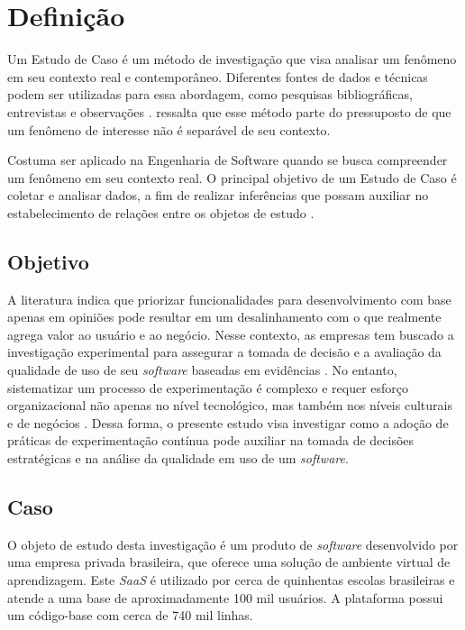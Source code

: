 \section{Definição}

Um Estudo de Caso é um método de investigação que visa analisar um fenômeno em seu contexto real e contemporâneo. Diferentes fontes de dados e técnicas podem ser utilizadas para essa abordagem, como pesquisas bibliográficas, entrevistas e observações \cite{wohlin_experimentation_2012}.  ressalta que esse método parte do pressuposto de que um fenômeno de interesse não é separável de seu contexto.

Costuma ser aplicado na Engenharia de Software quando se busca compreender um fenômeno em seu contexto real. O principal objetivo de um Estudo de Caso é coletar e analisar dados, a fim de realizar inferências que possam auxiliar no estabelecimento de relações entre os objetos de estudo \cite{wohlin_experimentation_2012}.


\subsection{Objetivo}

A literatura indica que priorizar funcionalidades para desenvolvimento com base apenas em opiniões pode resultar em um desalinhamento com o que realmente agrega valor ao usuário e ao negócio. Nesse contexto, as empresas tem buscado a investigação experimental para assegurar a tomada de decisão e a avaliação da qualidade de uso de seu \textit{software} baseadas em evidências \cite{olsson_opinions_2014}. No entanto, sistematizar um processo de experimentação é complexo e requer esforço organizacional não apenas no nível tecnológico, mas também nos níveis culturais e de negócios \cite{fabijan_evolution_2017}. Dessa forma, o presente estudo visa investigar como a adoção de práticas de experimentação contínua pode auxiliar na tomada de decisões estratégicas e na análise da qualidade em uso de um \textit{software}.


\subsection{Caso}

O objeto de estudo desta investigação é um produto de \textit{software} desenvolvido por uma empresa privada brasileira, que oferece uma solução de ambiente virtual de aprendizagem. Este  \textit{SaaS} é utilizado por cerca de quinhentas escolas brasileiras e atende a uma base de aproximadamente 100 mil usuários. A plataforma possui um código-base com cerca de 740 mil linhas.

